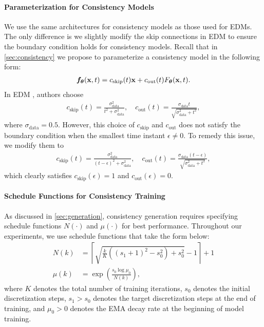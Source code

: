 \begin{appendices}
\paragraph{Parameterization for Consistency Models} We use the same architectures for consistency models as those used for EDMs. The only difference is we slightly modify the skip connections in EDM to ensure the boundary condition holds for consistency models. Recall that in \cref{sec:consistency} we propose to parameterize a consistency model in the following form:
\begin{align*}
    {\bm{f}}_{\bm{\theta}}({\mathbf{x}}, t) = c_\text{skip}(t){\mathbf{x}} + c_\text{out}(t) F_{\bm{\theta}}({\mathbf{x}}, t).
\end{align*}
In EDM \cite{karras2022edm}, authors choose
\begin{align*}
    c_\text{skip}(t) = \frac{\sigma_\text{data}^2}{t^2 + \sigma_\text{data}^2},\quad c_\text{out}(t) = \frac{\sigma_\text{data} t }{\sqrt{\sigma_\text{data}^2 + t^2}},
\end{align*}
where $\sigma_\text{data} = 0.5$. However, this choice of $c_\text{skip}$ and $c_\text{out}$ does not satisfy the boundary condition when the smallest time instant $\epsilon \neq 0$. To remedy this issue, we modify them to
\begin{align*}
    c_\text{skip}(t) = \frac{\sigma_\text{data}^2}{(t-\epsilon)^2 + \sigma_\text{data}^2},\quad c_\text{out}(t) = \frac{\sigma_\text{data} (t-\epsilon) }{\sqrt{\sigma_\text{data}^2 + t^2}},
\end{align*}
which clearly satisfies $c_\text{skip}(\epsilon) = 1$ and $c_\text{out}(\epsilon) = 0$.

\paragraph{Schedule Functions for Consistency Training} As discussed in \cref{sec:generation}, consistency generation requires specifying schedule functions $N(\cdot)$ and $\mu(\cdot)$ for best performance. Throughout our experiments, we use schedule functions that take the form below:
\begin{align*}
    N(k) &= \left\lceil \sqrt{\frac{k}{K} ((s_1 + 1)^2 - s_0^2) + s_0^2} - 1 \right\rceil + 1\\
    \mu(k) &= \exp\left(\frac{s_0 \log \mu_0}{N(k)}\right),
\end{align*}
where $K$ denotes the total number of training iterations, $s_0$ denotes the initial discretization steps, $s_1 > s_0$ denotes the target discretization steps at the end of training, and $\mu_0 > 0$ denotes the EMA decay rate at the beginning of model training.


\end{appendices}
